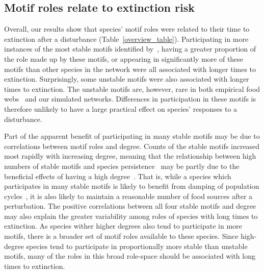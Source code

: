 \documentclass[12pt]{article}
\begin{document}
\begin{spacing}{2.0}
	\subsection*{Motif roles relate to extinction risk}

		Overall, our results show that species' motif roles were related to their time to extinction after a disturbance (Table~\ref{overview_table}).
		Participating in more instances of the most stable motifs identified by~\citet{Stouffer2007,Borrelli2015a}, having a greater proportion of the role made up by these motifs, or appearing in significantly more of these motifs than other species in the network were all associated with longer times to extinction. 
		Surprisingly, some unstable motifs were also associated with longer times to extinction.
		The unstable motifs are, however, rare in both empirical food webs~\citep{Stouffer2007} and our simulated networks.
		Differences in participation in these motifs is therefore unlikely to have a large practical effect on species' responses to a disturbance.
        
        
        Part of the apparent benefit of participating in many stable motifs may be due to correlations between motif roles and degree.
        Counts of the stable motifs increased most rapidly with increasing degree, meaning that the relationship between high numbers of stable motifs and species persistence~\citep{Stouffer2007,Borrelli2015a} may be partly due to the beneficial effects of having a high degree~\citep{Cirtwill2016a}.
		That is, while a species which participates in many stable motifs is likely to benefit from damping of population cycles~\citep{Borrelli2015a}, it is also likely to maintain a reasonable number of food sources after a perturbation.
		The positive correlations between all four stable motifs and degree may also explain the greater variability among roles of species with long times to extinction.
		As species wither higher degrees also tend to participate in more motifs, there is a broader set of motif roles available to these species.
		Since high-degree species tend to participate in proportionally more stable than unstable motifs, many of the roles in this broad role-space should be associated with long times to extinction.
		

\end{spacing}
\end{document}
